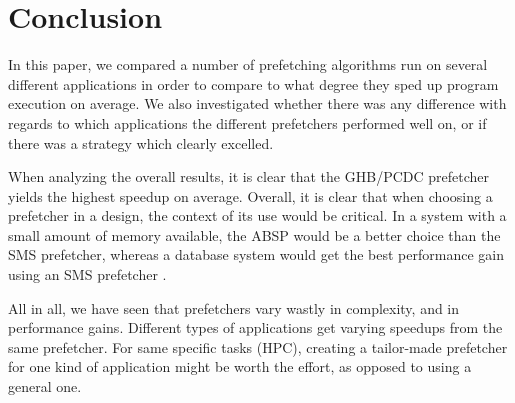 
\section{Conclusion}
\label{sec:conclusion}

In this paper, we compared a number of prefetching algorithms run on
several different applications in order to compare to what degree they
sped up program execution on average. We also investigated whether
there was any difference with regards to which applications the
different prefetchers performed well on, or if there was a strategy
which clearly excelled.

When analyzing the overall results, it is clear that the GHB/PCDC prefetcher yields the highest speedup on average. Overall, it is clear that when choosing a prefetcher in a design, the context of its use would be critical. In a system with a small amount of memory available, the ABSP would be a better choice than the SMS prefetcher, whereas a database system would get the best performance gain using an SMS prefetcher \cite{sms-is-best}. 

All in all, we have seen that prefetchers vary wastly in complexity, and in performance gains. Different types of applications get varying speedups from the same prefetcher. For same specific tasks (HPC), creating a tailor-made prefetcher for one kind of application might be worth the effort, as opposed to using a general one.
